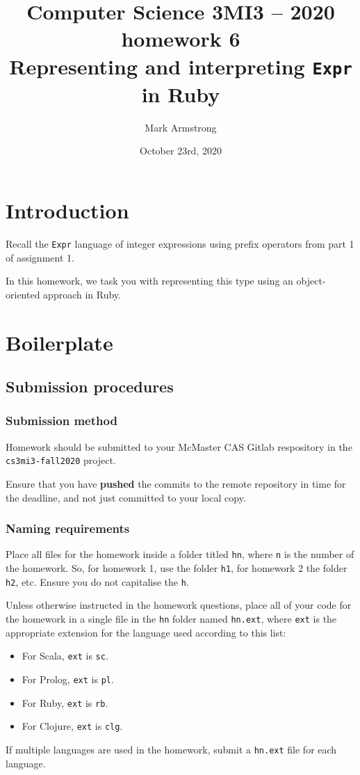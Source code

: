 \documentclass[11pt]{article}
\author{Mark Armstrong}
\date{October 23rd, 2020}
\title{Computer Science 3MI3 – 2020 homework 6\\\medskip
\large Representing and interpreting \texttt{Expr} in Ruby}
\begin{document}
\maketitle
\tableofcontents


\section*{Introduction}
\label{sec:org5b00dcb}
Recall the \texttt{Expr} language of integer expressions
using prefix operators from part 1 of assignment 1.

In this homework, we task you with representing this type
using an object-oriented approach in Ruby.

\section*{Boilerplate}
\label{sec:org5f38c60}
\subsection*{Submission procedures}
\label{sec:orgab0c253}
\subsubsection*{Submission method}
\label{sec:org63e8f4b}

Homework should be submitted to your McMaster CAS Gitlab respository
in the \texttt{cs3mi3-fall2020} project.

Ensure that you have \textbf{pushed} the commits to the remote repository
in time for the deadline, and not just committed to your local copy.

\subsubsection*{Naming requirements}
\label{sec:org15f55ca}

Place all files for the homework
inside a folder titled \texttt{hn}, where \texttt{n} is the number of the homework.
So, for homework 1, use the folder \texttt{h1}, for homework 2 the folder \texttt{h2}, etc.
Ensure you do not capitalise the \texttt{h}.

Unless otherwise instructed in the homework questions,
place all of your code for the homework
in a single file in the \texttt{hn} folder named \texttt{hn.ext},
where \texttt{ext} is the appropriate extension for the language used
according to this list:
\begin{itemize}
\item For Scala, \texttt{ext} is \texttt{sc}.
\item For Prolog, \texttt{ext} is \texttt{pl}.
\item For Ruby, \texttt{ext} is \texttt{rb}.
\item For Clojure, \texttt{ext} is \texttt{clg}.
\end{itemize}
If multiple languages are used in the homework,
submit a \texttt{hn.ext} file for each language.
\end{document}
